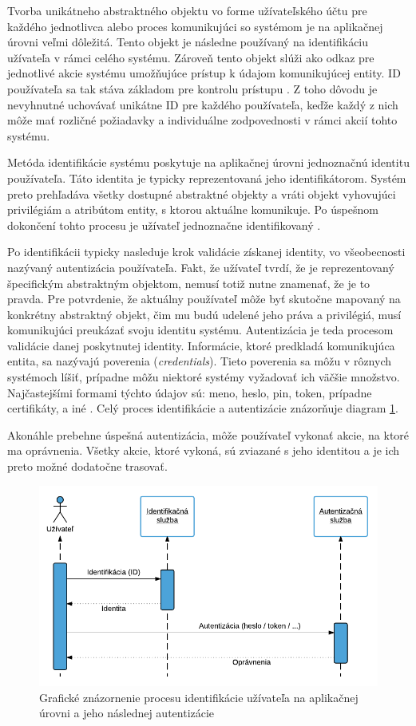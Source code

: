 \documentclass[
  digital, %
  oneside, %
  table,   %
  lof,     %
  nolot,   %
  nocover
]{fithesis3}
\begin{document}
Tvorba unikátneho abstraktného objektu vo forme užívateľského účtu
pre každého jednotlivca alebo proces komunikujúci so systémom je na aplikačnej
úrovni veľmi dôležitá. Tento objekt je následne používaný na identifikáciu
užívateľa v rámci celého systému. Zároveň tento objekt slúži ako odkaz pre
jednotlivé akcie systému umožňujúce prístup k údajom komunikujúcej entity.
ID používateľa sa tak stáva základom pre kontrolu prístupu \cite{Todorov:2007:EX}. Z toho dôvodu je 
nevyhnutné uchovávať unikátne ID pre každého používateľa, keďže každý z nich
môže mať rozličné požiadavky a individuálne zodpovednosti v rámci akcií tohto
systému.

Metóda identifikácie systému poskytuje na aplikačnej úrovni jednoznačnú
identitu používateľa. Táto identita je typicky reprezentovaná jeho
identifikátorom. Systém preto prehľadáva všetky dostupné abstraktné objekty a
vráti objekt vyhovujúci privilégiám a atribútom entity, s ktorou aktuálne
komunikuje. Po úspešnom dokončení tohto procesu je užívateľ jednoznačne
identifikovaný \cite{Todorov:2007:EX}.

Po identifikácii typicky nasleduje krok validácie získanej identity,
vo všeobecnosti nazývaný autentizácia používateľa. Fakt, že užívateľ tvrdí,
že je reprezentovaný špecifickým abstraktným objektom, nemusí totiž nutne
znamenať, že je to pravda. Pre potvrdenie, že aktuálny používateľ môže byť
skutočne mapovaný na konkrétny abstraktný objekt, čim mu budú udelené jeho
práva a privilégiá, musí komunikujúci preukázať svoju identitu systému.
Autentizácia je teda procesom validácie danej poskytnutej identity. Informácie,
ktoré predkladá komunikujúca entita, sa nazývajú poverenia
(\textit{credentials}). Tieto poverenia sa môžu v rôznych systémoch líšiť, 
prípadne môžu niektoré systémy vyžadovať ich väčšie množstvo. Najčastejšími
formami týchto údajov sú: meno, heslo, pin, token, prípadne certifikáty, a iné \cite{Todorov:2007:EX}.
Celý proces identifikácie a autentizácie znázorňuje diagram \ref{fig:tech-app}.

Akonáhle prebehne úspešná autentizácia, môže používateľ vykonať akcie, na ktoré
ma oprávnenia. Všetky akcie, ktoré vykoná, sú zviazané s jeho identitou a je ich
preto možné dodatočne trasovať.

\begin{figure}[h]
  \centering
    \includegraphics[width=.94\textwidth]{images/tech-app.png}
  \caption{Grafické znázornenie procesu identifikácie užívateľa na aplikačnej
  úrovni a jeho následnej autentizácie}
  \label{fig:tech-app}
\end{figure}
\end{document}
